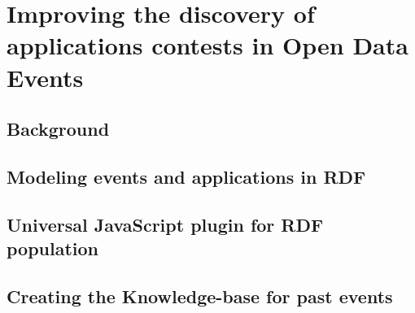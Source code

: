 \section{Improving the discovery of applications contests in Open Data Events}
\label{sec:contests}


\subsection{Background}
\label{sec:backcontest}

\subsection{Modeling events and applications in RDF}
\label{sec:modeleventsapps}

\subsection{Universal JavaScript plugin for RDF population}
\label{sec:plugin}

\subsection{Creating the Knowledge-base for past events}